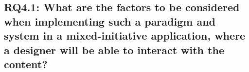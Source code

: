 









\subsection[Research Question 4.1]{RQ4.1: What are the factors to be considered when implementing such a paradigm and system in a mixed-initiative application, where a designer will be able to interact with the content?}



